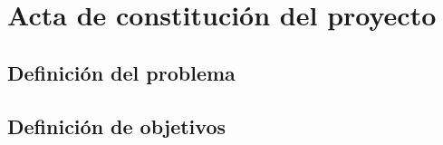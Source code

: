 \section{Acta de constitución del proyecto}
\label{section:acta}

\Blindtext

\subsection{Definición del problema}
\label{subsection:problema}

\Blindtext

\subsection{Definición de objetivos}
\label{subsection:objetivos}

\Blindtext

